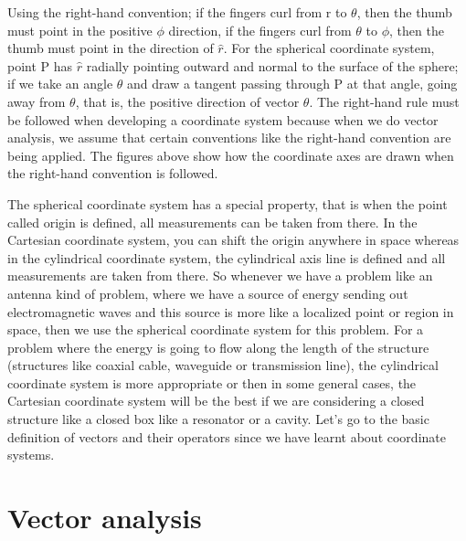 Using the right-hand convention; if the fingers curl from r to $\theta$, then the thumb must point in the positive $\phi$ direction, if the fingers curl from $\theta$ to $\phi$, then the thumb must point in the direction of $\hat{r}$. For the spherical coordinate system, point P has $\hat{r}$ radially pointing outward and normal to the surface of the sphere; if we take an angle $\theta$ and draw a tangent passing through P at that angle, going away from $\theta$, that is, the positive direction of vector $\theta$. The right-hand rule must be followed when developing a coordinate system because when we do vector analysis, we assume that certain conventions like the right-hand convention are being applied. The figures above show how the coordinate axes are drawn when the right-hand convention is followed.

The spherical coordinate system has a special property, that is when the point called origin is defined, all measurements can be taken from there. In the Cartesian coordinate system, you can shift the origin anywhere in space whereas in the cylindrical coordinate system, the cylindrical axis line is defined and all measurements are taken from there. So whenever we have a problem like an antenna kind of problem, where we have a source of energy sending out electromagnetic waves and this source is more like a localized point or region in space, then we use the spherical coordinate system for this problem. For a problem where the energy is going to flow along the length of the structure (structures like coaxial cable, waveguide or transmission line), the cylindrical coordinate system is more appropriate or then in some general cases, the Cartesian coordinate system will be the best if we are considering a closed structure like a closed box like a resonator or a cavity. Let's go to the basic definition of vectors and their operators since we have learnt about coordinate systems. 

\section{Vector analysis}

